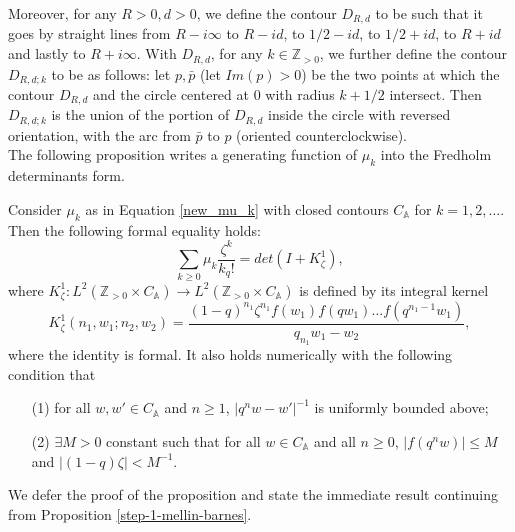 Moreover, for any $R > 0, d > 0$, we define the contour $D_{R,d}$ to be such that it goes by straight lines from $R - i\infty$ to $R - i d$, to $1/2 - i d$, to $1/2 + id$, to $R + id$ and lastly to $R+i\infty$. With $D_{R,d}$, for any $k \in \mathbb{Z}_{>0}$, we further define the contour $D_{R,d;k}$ to be as follows: let $p, \bar{p}$ (let $Im(p) > 0$) be the two points at which the contour $D_{R,d}$ and the circle centered at 0 with radius $k+1/2$ intersect. Then $D_{R,d;k}$ is the union of the portion of $D_{R,d}$ inside the circle with reversed orientation, with the arc from $\bar{p}$ to $p$ (oriented counterclockwise). \\

The following proposition writes a generating function of $\mu_k$ into the Fredholm determinants form.
\begin{proposition}
\label{step-1-mellin-barnes}
Consider $\mu_k$ as in Equation \ref{new_mu_k} with closed contours $C_{\mathbb{A}}$ for $k = 1,2,\dots$. Then the following formal equality holds:
$$\sum_{k \ge 0} \mu_k \frac{\zeta^k}{k_q!} = det(I+K_{\zeta}^{1}),$$ where $K_{\zeta}^1:L^2(\mathbb{Z}_{>0} \times C_{\mathbb{A}}) \rightarrow L^2(\mathbb{Z}_{>0} \times C_{\mathbb{A}})$ is defined by its integral kernel $$K_{\zeta}^1(n_1, w_1; n_2, w_2)= \frac{(1-q)^{n_1} \zeta^{n_1} f(w_1) f(qw_1) \dots f(q^{n_1-1}w_1)}{q_{n_1}w_1 - w_2},$$
where the identity is formal. It also holds numerically with the following condition that
\begin{enumerate}
\item[(1)] for all $w, w' \in C_{\mathbb{A}}$ and $n \ge 1$, $|q^n w - w'|^{-1}$ is uniformly bounded above;
\item[(2)] $\exists M > 0$ constant such that for all $w \in C_{\mathbb{A}}$ and all $n \ge 0$, $|f(q^n w)| \le M$ and $|(1-q) \zeta| < M^{-1}$.
\end{enumerate}
\end{proposition}

We defer the proof of the proposition and state the immediate result continuing from Proposition \ref{step-1-mellin-barnes}.

